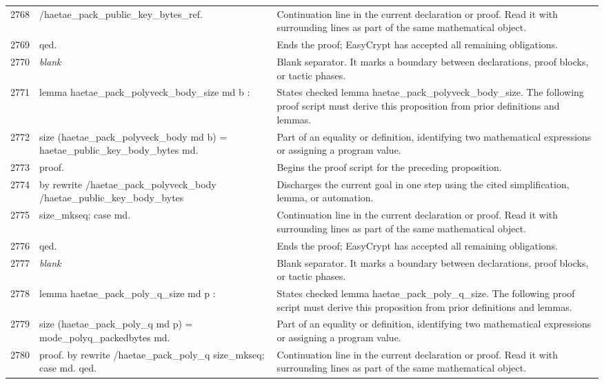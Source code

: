 \documentclass[10pt]{article}
\begin{document}
\begin{longtable}{r L{0.53\textwidth} L{0.37\textwidth}}
2768 & {\ttfamily\scriptsize                    /haetae\_pack\_public\_key\_bytes\_ref.} & Continuation line in the current declaration or proof.  Read it with surrounding lines as part of the same mathematical object. \\
2769 & {\ttfamily\scriptsize qed.} & Ends the proof; EasyCrypt has accepted all remaining obligations. \\
2770 & {\ttfamily\scriptsize \emph{blank}} & Blank separator.  It marks a boundary between declarations, proof blocks, or tactic phases. \\
2771 & {\ttfamily\scriptsize lemma haetae\_pack\_polyveck\_body\_size md b :} & States checked lemma haetae\_pack\_polyveck\_body\_size.  The following proof script must derive this proposition from prior definitions and lemmas. \\
2772 & {\ttfamily\scriptsize   size (haetae\_pack\_polyveck\_body md b) = haetae\_public\_key\_body\_bytes md.} & Part of an equality or definition, identifying two mathematical expressions or assigning a program value. \\
2773 & {\ttfamily\scriptsize proof.} & Begins the proof script for the preceding proposition. \\
2774 & {\ttfamily\scriptsize by rewrite /haetae\_pack\_polyveck\_body /haetae\_public\_key\_body\_bytes} & Discharges the current goal in one step using the cited simplification, lemma, or automation. \\
2775 & {\ttfamily\scriptsize            size\_mkseq; case md.} & Continuation line in the current declaration or proof.  Read it with surrounding lines as part of the same mathematical object. \\
2776 & {\ttfamily\scriptsize qed.} & Ends the proof; EasyCrypt has accepted all remaining obligations. \\
2777 & {\ttfamily\scriptsize \emph{blank}} & Blank separator.  It marks a boundary between declarations, proof blocks, or tactic phases. \\
2778 & {\ttfamily\scriptsize lemma haetae\_pack\_poly\_q\_size md p :} & States checked lemma haetae\_pack\_poly\_q\_size.  The following proof script must derive this proposition from prior definitions and lemmas. \\
2779 & {\ttfamily\scriptsize   size (haetae\_pack\_poly\_q md p) = mode\_polyq\_packedbytes md.} & Part of an equality or definition, identifying two mathematical expressions or assigning a program value. \\
2780 & {\ttfamily\scriptsize proof. by rewrite /haetae\_pack\_poly\_q size\_mkseq; case md. qed.} & Continuation line in the current declaration or proof.  Read it with surrounding lines as part of the same mathematical object. \\

\end{longtable}
\end{document}
